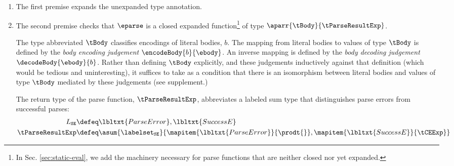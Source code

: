 \documentclass[acmlarge,review,anonymous]{acmart}\settopmatter{printfolios=true}
\begin{document}
\begin{enumerate}
\item The first premise expands the unexpanded type annotation.

\item The second premise checks that $\eparse$ is a closed expanded function\footnote{In Sec. \ref{sec:static-eval}, we add the machinery necessary for parse functions that are neither closed nor yet expanded.} of type $\aparr{\tBody}{\tParseResultExp}$. 

The type abbreviated $\tBody$ classifies encodings of literal bodies, $b$. The mapping from literal bodies to values of type $\tBody$ is defined by the \emph{body encoding judgement} $\encodeBody{b}{\ebody}$. An inverse mapping is defined   by the \emph{body decoding judgement} $\decodeBody{\ebody}{b}$. Rather than defining $\tBody$ explicitly, and these judgements inductively against that definition (which would be tedious and uninteresting), it suffices to take as a condition that there is an isomorphism between literal bodies and values of type $\tBody$ mediated by these judgements (see supplement.)

The return type of the parse function, $\tParseResultExp$, abbreviates a labeled sum type that distinguishes parse errors from successful parses:
\begin{align*}
L_\mathtt{SE} & \defeq \lbltxt{ParseError}, \lbltxt{SuccessE}\\
\tParseResultExp & \defeq \asum{\labelset_\mathtt{SE}}{
  \mapitem{\lbltxt{ParseError}}{\prodt{}}, 
  \mapitem{\lbltxt{SuccessE}}{\tCEExp}
}
\end{align*} %


\end{enumerate}
\end{document}
